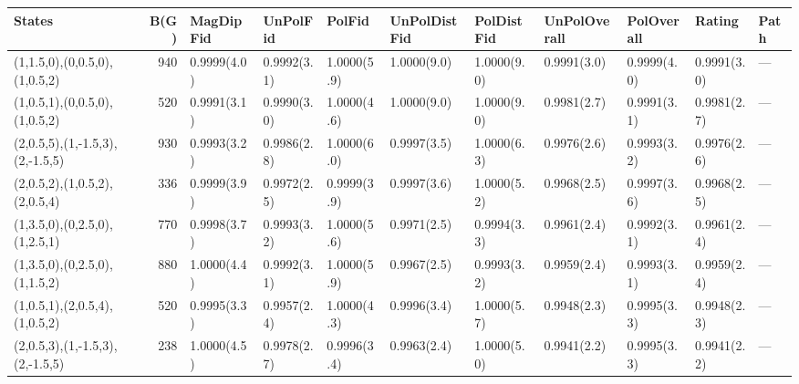 \begin{tabular}{lrlllllllll}
\hline
 States                          &   B(G) & MagDipFid   & UnPolFid    & PolFid      & UnPolDistFid   & PolDistFid   & UnPolOverall   & PolOverall   & Rating      & Path   \\
\hline
 (1,1.5,0),(0,0.5,0),(1,0.5,2)   &    940 & 0.9999(4.0) & 0.9992(3.1) & 1.0000(5.9) & 1.0000(9.0)    & 1.0000(9.0)  & 0.9991(3.0)    & 0.9999(4.0)  & 0.9991(3.0) & ---    \\
 (1,0.5,1),(0,0.5,0),(1,0.5,2)   &    520 & 0.9991(3.1) & 0.9990(3.0) & 1.0000(4.6) & 1.0000(9.0)    & 1.0000(9.0)  & 0.9981(2.7)    & 0.9991(3.1)  & 0.9981(2.7) & ---    \\
 (2,0.5,5),(1,-1.5,3),(2,-1.5,5) &    930 & 0.9993(3.2) & 0.9986(2.8) & 1.0000(6.0) & 0.9997(3.5)    & 1.0000(6.3)  & 0.9976(2.6)    & 0.9993(3.2)  & 0.9976(2.6) & ---    \\
 (2,0.5,2),(1,0.5,2),(2,0.5,4)   &    336 & 0.9999(3.9) & 0.9972(2.5) & 0.9999(3.9) & 0.9997(3.6)    & 1.0000(5.2)  & 0.9968(2.5)    & 0.9997(3.6)  & 0.9968(2.5) & ---    \\
 (1,3.5,0),(0,2.5,0),(1,2.5,1)   &    770 & 0.9998(3.7) & 0.9993(3.2) & 1.0000(5.6) & 0.9971(2.5)    & 0.9994(3.3)  & 0.9961(2.4)    & 0.9992(3.1)  & 0.9961(2.4) & ---    \\
 (1,3.5,0),(0,2.5,0),(1,1.5,2)   &    880 & 1.0000(4.4) & 0.9992(3.1) & 1.0000(5.9) & 0.9967(2.5)    & 0.9993(3.2)  & 0.9959(2.4)    & 0.9993(3.1)  & 0.9959(2.4) & ---    \\
 (1,0.5,1),(2,0.5,4),(1,0.5,2)   &    520 & 0.9995(3.3) & 0.9957(2.4) & 1.0000(4.3) & 0.9996(3.4)    & 1.0000(5.7)  & 0.9948(2.3)    & 0.9995(3.3)  & 0.9948(2.3) & ---    \\
 (2,0.5,3),(1,-1.5,3),(2,-1.5,5) &    238 & 1.0000(4.5) & 0.9978(2.7) & 0.9996(3.4) & 0.9963(2.4)    & 1.0000(5.0)  & 0.9941(2.2)    & 0.9995(3.3)  & 0.9941(2.2) & ---    \\
\hline
\end{tabular}